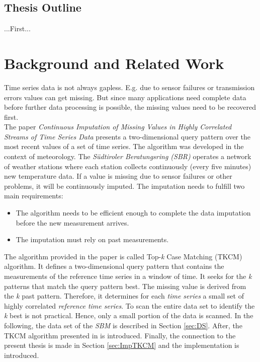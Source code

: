 \documentclass[abstracton,12pt]{scrreprt}
\begin{document}
\section{Thesis Outline}
...First...

\chapter{Background and Related Work}
Time series data is not always gapless. E.g. due to sensor failures or transmission errors values can get missing. But since many applications need complete data before further data processing is possible, the missing values need to be recovered first. \\The paper \emph{Continuous Imputation of Missing Values in Highly Correlated Streams of Time Series Data} \cite{BScT} presents a two-dimensional query pattern over the most recent values of a set of time series. The algorithm was developed in the context of meteorology. The \emph{Südtiroler Beratungsring (SBR)} operates a network of weather stations where each station collects continuously (every five minutes) new temperature data. If a value is missing due to sensor failures or other problems, it will be continuously imputed. The imputation needs to fulfill two main requirements: \\
\begin{itemize}  
	\item The algorithm needs to be efficient enough to complete the data imputation before the new measurement arrives. 
	\item The imputation must rely on past measurements.\\
\end{itemize}
The algorithm provided in the paper is called Top-\emph{k} Case Matching (TKCM) algorithm. It defines a two-dimensional query pattern that contains the measurements of the reference time series in a window of time. It seeks for the \emph{k} patterns that match the query pattern best. The missing value is derived from the \emph{k} past pattern. Therefore, it determines for each \emph{time series} a small set of highly correlated \emph{reference time series}. To scan the entire data set to identify the \emph{k} best is not practical. Hence, only a small portion of the data is scanned. In the following, the data set of the \emph{SBM} is described in Section \ref{sec:DS}. After, the TKCM algorithm presented in \cite{BScT} is introduced. Finally, the connection to the present thesis is made in Section \ref{sec:ImpTKCM} and the implementation is introduced. 
\end{document}
